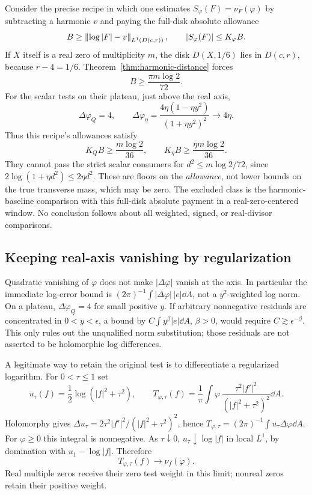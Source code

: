 Consider the precise recipe in which one estimates
$S_\varphi(F)=\nu_F(\varphi)$ by subtracting a harmonic $v$ and
paying the full-disk absolute allowance
\[
 B\ge\left\|\log|F|-v\right\|_{L^1(D(c,r))},\qquad
 |S_\varphi(F)|\le K_\varphi B.
\]
If $X$ itself is a real zero of multiplicity $m$, the disk
$D(X,1/6)$ lies in $D(c,r)$, because $r-4=1/6$.
Theorem~\ref{thm:harmonic-distance} forces
\begin{equation}\label{eq:baseline-floor}
 B\ge\frac{\pi m\log2}{72}.
\end{equation}
For the scalar tests on their plateau, just above the real axis,
\[
 \Delta\varphi_Q=4,\qquad
 \Delta\varphi_\eta=
        \frac{4\eta(1-\eta y^2)}{(1+\eta y^2)^2}
                  \longrightarrow4\eta .
\]
Thus this recipe's allowances satisfy
\begin{equation}\label{eq:allowance-floors}
 K_QB\ge\frac{m\log2}{36},\qquad
 K_\eta B\ge\frac{\eta m\log2}{36}.
\end{equation}
They cannot pass the strict scalar consumers for
$d^2\le m\log2/72$, since
$2\log(1+\eta d^2)\le2\eta d^2$.
These are floors on the \emph{allowance}, not lower bounds on
the true transverse mass, which may be zero.
The excluded class is the harmonic-baseline comparison with this
full-disk absolute payment in a real-zero-centered window.
No conclusion follows about all weighted, signed, or real-divisor
comparisons.

\subsection{Keeping real-axis vanishing by regularization}

Quadratic vanishing of $\varphi$ does not make
$|\Delta\varphi|$ vanish at the axis. In particular the immediate
log-error bound is
$(2\pi)^{-1}\int|\Delta\varphi|\,|e|\dd A$,
not a $y^2$-weighted log norm. On a plateau,
$\Delta\varphi_Q=4$ for small positive $y$.
If arbitrary nonnegative residuals are concentrated in
$0<y<\epsilon$, a bound by
$C\int y^\beta |e|\dd A$, $\beta>0$, would require
$C\gtrsim\epsilon^{-\beta}$.
This only rules out the unqualified norm substitution; those
residuals are not asserted to be holomorphic log differences.

A legitimate way to retain the original test is to differentiate
a regularized logarithm. For $0<\tau\le1$ set
\[
 u_\tau(f)=\frac12\log(|f|^2+\tau^2),\qquad
 T_{\varphi,\tau}(f)=\frac1\pi
       \int\varphi\,\frac{\tau^2|f'|^2}
                            {(|f|^2+\tau^2)^2}\dd A .
\]
Holomorphy gives
$\Delta u_\tau=2\tau^2|f'|^2/(|f|^2+\tau^2)^2$, hence
$T_{\varphi,\tau}=(2\pi)^{-1}\int u_\tau\Delta\varphi\dd A$.
For $\varphi\ge0$ this integral is nonnegative. As $\tau\downarrow0$,
$u_\tau\downarrow\log|f|$ in local $L^1$, by domination with
$u_1-\log|f|$. Therefore
\begin{equation}\label{eq:regularized-limit}
 T_{\varphi,\tau}(f)\longrightarrow\nu_f(\varphi).
\end{equation}
Real multiple zeros receive their zero test weight in this limit;
nonreal zeros retain their positive weight.

